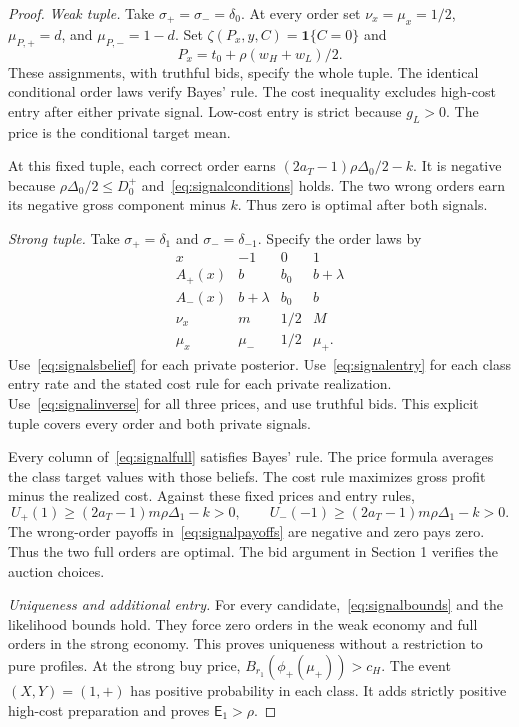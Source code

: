 \documentclass[12pt]{article}
\newcommand{\Ent}{\mathsf E}
\newcommand{\ind}{\mathbf 1}
\begin{document}
\begin{proof}
\emph{Weak tuple.}
Take $\sigma_+=\sigma_-=\delta_0$.
At every order set $\nu_x=\mu_x=1/2$, $\mu_{P,+}=d$, and $\mu_{P,-}=1-d$.
Set $\zeta(P_x,y,C)=\ind\{C=0\}$ and
\[
 P_x=t_0+\rho(w_H+w_L)/2.
\]
These assignments, with truthful bids, specify the whole tuple.
The identical conditional order laws verify Bayes' rule.
The cost inequality excludes high-cost entry after either private signal.
Low-cost entry is strict because $g_L>0$.
The price is the conditional target mean.

At this fixed tuple, each correct order earns $(2a_T-1)\rho\Delta_0/2-k$.
It is negative because $\rho\Delta_0/2\le D^+_0$ and~\eqref{eq:signalconditions} holds.
The two wrong orders earn its negative gross component minus $k$.
Thus zero is optimal after both signals.

\emph{Strong tuple.}
Take $\sigma_+=\delta_1$ and $\sigma_-=\delta_{-1}$.
Specify the order laws by
\begin{equation}\label{eq:signalfull}
\begin{array}{c|ccc}
 x&-1&0&1\\ \hline
 A_+(x)&b&b_0&b+\lambda\\
 A_-(x)&b+\lambda&b_0&b\\
 \nu_x&m&1/2&M\\
 \mu_x&\mu_-&1/2&\mu_+.
\end{array}
\end{equation}
Use~\eqref{eq:signalsbelief} for each private posterior.
Use~\eqref{eq:signalentry} for each class entry rate and the stated cost rule for each private realization.
Use~\eqref{eq:signalinverse} for all three prices, and use truthful bids.
This explicit tuple covers every order and both private signals.

Every column of~\eqref{eq:signalfull} satisfies Bayes' rule.
The price formula averages the class target values with those beliefs.
The cost rule maximizes gross profit minus the realized cost.
Against these fixed prices and entry rules,
\[
 U_+(1)\ge(2a_T-1)m\rho\Delta_1-k>0,\qquad
 U_-(-1)\ge(2a_T-1)m\rho\Delta_1-k>0.
\]
The wrong-order payoffs in~\eqref{eq:signalpayoffs} are negative and zero pays zero.
Thus the two full orders are optimal.
The bid argument in Section 1 verifies the auction choices.

\emph{Uniqueness and additional entry.}
For every candidate,~\eqref{eq:signalbounds} and the likelihood bounds hold.
They force zero orders in the weak economy and full orders in the strong economy.
This proves uniqueness without a restriction to pure profiles.
At the strong buy price, $B_{r_1}(\phi_+(\mu_+))>c_H$.
The event $(X,Y)=(1,+)$ has positive probability in each class.
It adds strictly positive high-cost preparation and proves $\Ent_1>\rho$.
\end{proof}
\end{document}

